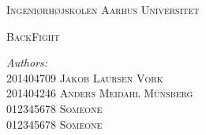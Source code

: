 \begin{titlingpage}
	\center %
	
	\textsc{\LARGE Ingeniørhøjskolen Aarhus Universitet}\\[1.5cm]
	
	

	\begin{vplace}[0.7]
		\textsc{\LARGE BackFight}\\[0.5cm] 		
		
		\vspace{15mm}
	
		\begin{minipage}{0.4\textwidth}
			\begin{flushleft} \large
				
				\emph{Authors:}\\ 
				
				201404709 \textsc{Jakob Laursen Vork}\\
				201404246 \textsc{Anders Meidahl Münsberg}\\
				012345678 \textsc{Someone}\\
				012345678 \textsc{Someone}\\
				
			\end{flushleft}
		\end{minipage}

	\end{vplace}	
\end{titlingpage}
